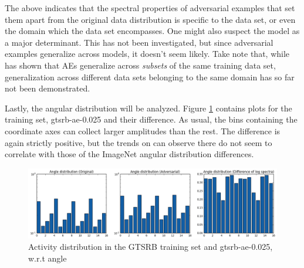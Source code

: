\documentclass[11pt, a4paper]{article}
\begin{document}
The above indicates that the spectral properties of adversarial examples that set them apart from the original data distribution is specific to the data set, or even the domain which the data set encompasses. One might also suspect the model as a major determinant. This has not been investigated, but since adversarial examples generalize across models, it doesn't seem likely. Take note that, while \cite{intriguing-properties-of-neural-networks} has shown that AEs generalize across \emph{subsets} of the same training data set, generalization across different data sets belonging to the same domain has so far not been demonstrated.

Lastly, the angular distribution will be analyzed. Figure \ref{fig:gtsrb-ae-0.025-angle} contains plots for the training set, gtsrb-ae-0.025 and their difference. As usual, the bins containing the coordinate axes can collect larger amplitudes than the rest. The difference is again strictly positive, but the trends on can observe there do not seem to correlate with those of the ImageNet angular distribution differences.

\begin{figure}[h!tb]
	\centering
	\includegraphics[width=\textwidth]{images/spectra/gtsrb-ae-0dot025-minconfidence-0dot5-maxorig-0-angle-16-bins.png}
	\caption{Activity distribution in the GTSRB training set and gtsrb-ae-0.025, w.r.t angle}
	\label{fig:gtsrb-ae-0.025-angle}
\end{figure}

\end{document}

